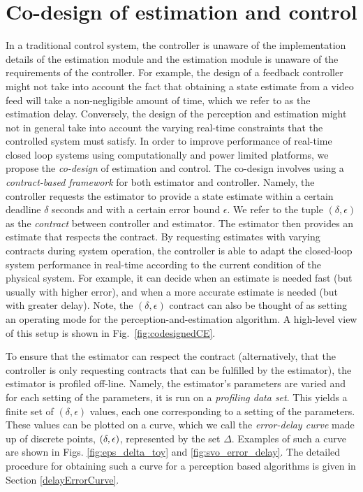 \section{Co-design of estimation and control}
\label{sec:codesign}
In a traditional control system, %
the controller is unaware of the implementation details of the estimation module and the estimation module is unaware of the requirements of the controller.
For example, the design of a feedback controller might not take into account the fact that obtaining a state estimate from a video feed will take a non-negligible amount of time, which we refer to as the estimation delay.
Conversely, the design of the perception and estimation might not in general take into account the varying real-time constraints that the controlled system must satisfy. %
In order to improve performance of real-time closed loop systems using computationally and power limited platforms, we propose the \emph{co-design} of estimation and control.
The co-design involves using a \emph{contract-based framework} for both estimator and controller.
Namely, the controller requests the estimator to provide a state estimate within a certain deadline $\delta$ seconds and with a certain error bound $\epsilon$.
We refer to the tuple $(\delta,\epsilon)$ as the \emph{contract} between controller and estimator. 
The estimator then provides an estimate that respects the contract.
By requesting estimates with varying contracts during system operation, the controller is able to adapt the closed-loop system performance in real-time according to the current condition of the physical system.
For example, it can decide when an estimate is needed fast (but usually with higher error), and when a more accurate estimate is needed (but with greater delay). Note, the $(\delta,\epsilon)$ contract can also be thought of as setting an operating mode for the perception-and-estimation algorithm. A high-level view of this setup is shown in Fig.~\ref{fig:codesignedCE}.

To ensure that the estimator can respect the contract (alternatively, that the controller is only requesting contracts that can be fulfilled by the estimator), the estimator is profiled off-line.
Namely, the estimator's parameters are varied and for each setting of the parameters, it is run on a \emph{profiling data set}. 
This yields a finite set of $(\delta,\epsilon)$ values, each one corresponding to a setting of the parameters.
These values can be plotted on a curve, which we call the \emph{error-delay curve} made up of discrete points, $(\delta,\epsilon)$, represented by the set $\Delta$. Examples of such a curve are shown in Figs. \ref{fig:eps_delta_toy} and \ref{fig:svo_error_delay}.
The detailed procedure for obtaining such a curve for a perception based algorithms is given in Section \ref{delayErrorCurve}.


